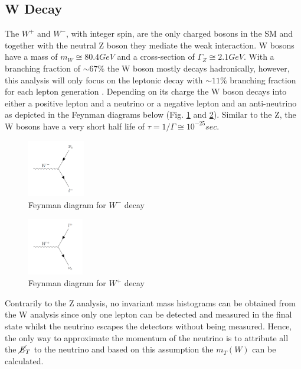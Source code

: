 \documentclass[runningheads,a4paper]{llncs}
\begin{document}
\subsection{W Decay}

The ${W}^{+}$ and ${W}^{-}$, with integer spin, are the only charged bosons in the SM and together with the neutral Z boson they mediate the weak interaction. W bosons have a mass of $m_{W}\cong 80.4 GeV$ and a cross-section of $\Gamma_{Z}\cong2.1 GeV$. With a branching fraction of $\sim67\%$ the W boson mostly decays hadronically, however, this analysis will only focus on the leptonic decay with $\sim11\%$ branching fraction for each lepton generation \cite{Agashe:2014kda}. Depending on its charge the W boson decays into either a positive lepton and a neutrino or a negative lepton and an anti-neutrino as depicted in the Feynman diagrams below (Fig. \ref{fig:feynmw-} and \ref{fig:feynmw+}). Similar to the Z, the W bosons have a very short half life of $\tau = 1/\Gamma\cong{ 10 }^{ -25 }sec$.\\

\begin{figure}[H]
\centering
\includegraphics[height=2.5cm]{feynm_W-}
\caption{Feynman diagram for ${W}^{-}$ decay}
\label{fig:feynmw-}
\end{figure}

\begin{figure}[H]
\centering
\includegraphics[height=2.5cm]{feynm_W+}
\caption{Feynman diagram for ${W}^{+}$ decay}
\label{fig:feynmw+}
\end{figure}

Contrarily to the Z analysis, no invariant mass histograms can be obtained from the W analysis since only one lepton can be detected and measured in the final state whilst the neutrino escapes the detectors without being measured. Hence, the only way to approximate the momentum of the neutrino is to attribute all the $\cancel{\it{E}}_{T}$ to the neutrino and based on this assumption the ${m}_{T}(W)$ can be calculated.\\
\end{document}
